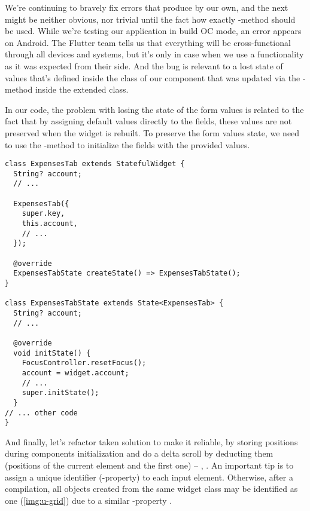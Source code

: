 \noindent We're continuing to bravely fix errors that produce by our own, and the next might be neither obvious, nor 
trivial until the fact how exactly -method should be used. While we're testing our application in build OC 
mode, an error appears on Android. The Flutter team tells us that everything will be cross-functional through all devices 
and systems, but it's only in case when we use a functionality as it was expected from their side. And the bug is relevant 
to a lost state of values that's defined inside the  class of our component that was updated via the 
-method inside the  extended class.

In our code, the problem with losing the state of the form values is related to the fact that by assigning default values 
directly to the fields, these values are not preserved when the widget is rebuilt. To preserve the form values state, 
we need to use the -method to initialize the fields with the provided values.

\begin{lstlisting}
class ExpensesTab extends StatefulWidget {
  String? account;
  // ...

  ExpensesTab({
    super.key,
    this.account,
    // ...
  });

  @override
  ExpensesTabState createState() => ExpensesTabState();
}

class ExpensesTabState extends State<ExpensesTab> {
  String? account;
  // ...

  @override
  void initState() {
    FocusController.resetFocus();
    account = widget.account;
    // ...
    super.initState();
  }
// ... other code
}
\end{lstlisting}

\noindent And finally, let's refactor taken solution to make it reliable, by storing positions during components 
initialization and do a delta scroll by deducting them (positions of the current element and the first one) -- 
, . An important tip is to assign a unique identifier (-property) to each input 
element. Otherwise, after a compilation, all objects created from the same widget class may be identified as one 
(\cref{img:u-grid}) due to a similar -property  .

